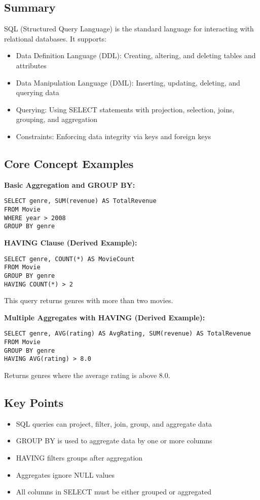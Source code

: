 \documentclass{article}
\begin{document}
\subsection*{Summary}
SQL (Structured Query Language) is the standard language for interacting with relational databases. It supports:
\begin{itemize}
    \item Data Definition Language (DDL): Creating, altering, and deleting tables and attributes
    \item Data Manipulation Language (DML): Inserting, updating, deleting, and querying data
    \item Querying: Using SELECT statements with projection, selection, joins, grouping, and aggregation
    \item Constraints: Enforcing data integrity via keys and foreign keys
\end{itemize}

\subsection*{Core Concept Examples}

\textbf{Basic Aggregation and GROUP BY:}
\begin{verbatim}
SELECT genre, SUM(revenue) AS TotalRevenue
FROM Movie
WHERE year > 2008
GROUP BY genre
\end{verbatim}

\textbf{HAVING Clause (Derived Example):}
\begin{verbatim}
SELECT genre, COUNT(*) AS MovieCount
FROM Movie
GROUP BY genre
HAVING COUNT(*) > 2
\end{verbatim}
This query returns genres with more than two movies.

\textbf{Multiple Aggregates with HAVING (Derived Example):}
\begin{verbatim}
SELECT genre, AVG(rating) AS AvgRating, SUM(revenue) AS TotalRevenue
FROM Movie
GROUP BY genre
HAVING AVG(rating) > 8.0
\end{verbatim}
Returns genres where the average rating is above 8.0.

\subsection*{Key Points}
\begin{itemize}
    \item SQL queries can project, filter, join, group, and aggregate data
    \item GROUP BY is used to aggregate data by one or more columns
    \item HAVING filters groups after aggregation
    \item Aggregates ignore NULL values
    \item All columns in SELECT must be either grouped or aggregated
\end{itemize}
\end{document}
